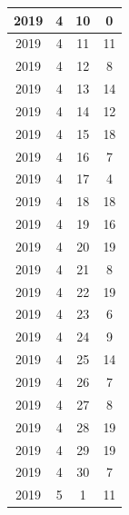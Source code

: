 \begin{longtable} {|c|c|c|c|}
\hline
2019         & 4            & 10           & 0                         \\ 
\hline
2019         & 4            & 11           & 11                        \\ 
\hline
2019         & 4            & 12           & 8                         \\ 
\hline
2019         & 4            & 13           & 14                        \\ 
\hline
2019         & 4            & 14           & 12                        \\ 
\hline
2019         & 4            & 15           & 18                        \\ 
\hline
2019         & 4            & 16           & 7                         \\ 
\hline
2019         & 4            & 17           & 4                         \\ 
\hline
2019         & 4            & 18           & 18                        \\ 
\hline
2019         & 4            & 19           & 16                        \\ 
\hline
2019         & 4            & 20           & 19                        \\ 
\hline
2019         & 4            & 21           & 8                         \\ 
\hline
2019         & 4            & 22           & 19                        \\ 
\hline
2019         & 4            & 23           & 6                         \\ 
\hline
2019         & 4            & 24           & 9                         \\ 
\hline
2019         & 4            & 25           & 14                        \\ 
\hline
2019         & 4            & 26           & 7                         \\ 
\hline
2019         & 4            & 27           & 8                         \\ 
\hline
2019         & 4            & 28           & 19                        \\ 
\hline
2019         & 4            & 29           & 19                        \\ 
\hline
2019         & 4            & 30           & 7                         \\ 
\hline
2019         & 5            & 1            & 11                        \\ 

\end{longtable}
